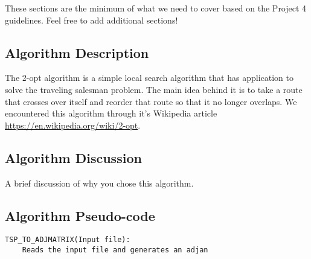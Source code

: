 \documentclass[../report/main.tex]{subfiles}
\begin{document}
These sections are the minimum of what we need to cover based on the Project 4 guidelines. Feel free to add additional sections!

\subsection*{Algorithm Description}

The 2-opt algorithm is a simple local search algorithm that has application to solve the traveling salesman problem. The main idea behind it is to take a route that crosses over itself and reorder that route so that it no longer overlaps. We encountered this algorithm through it's Wikipedia article \url{https://en.wikipedia.org/wiki/2-opt}.

\subsection*{Algorithm Discussion}

A brief discussion of why you chose this algorithm.

\subsection*{Algorithm Pseudo-code}

\begin{verbatim}
TSP_TO_ADJMATRIX(Input file):
    Reads the input file and generates an adjan
\end{verbatim}
\end{document}
